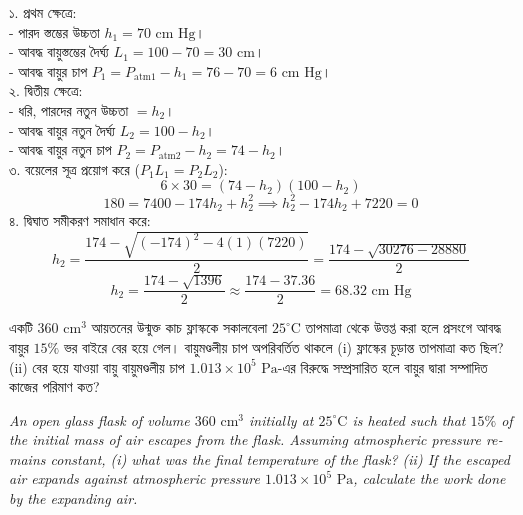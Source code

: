 \documentclass[12pt, a4paper]{article}
\begin{document}
{\vspace{1em}

\begin{tcolorbox}[solutionbox={সমাধান (Solution)}]
\noindent
১. প্রথম ক্ষেত্রে: \\
- পারদ স্তম্ভের উচ্চতা $h_1 = 70\text{ cm Hg}$। \\
- আবদ্ধ বায়ুস্তম্ভের দৈর্ঘ্য $L_1 = 100 - 70 = 30\text{ cm}$। \\
- আবদ্ধ বায়ুর চাপ $P_1 = P_{\text{atm1}} - h_1 = 76 - 70 = 6\text{ cm Hg}$। \\
২. দ্বিতীয় ক্ষেত্রে: \\
- ধরি, পারদের নতুন উচ্চতা $= h_2$। \\
- আবদ্ধ বায়ুর নতুন দৈর্ঘ্য $L_2 = 100 - h_2$। \\
- আবদ্ধ বায়ুর নতুন চাপ $P_2 = P_{\text{atm2}} - h_2 = 74 - h_2$। \\
৩. বয়েলের সূত্র প্রয়োগ করে ($P_1 L_1 = P_2 L_2$):
\[ 6 \times 30 = (74 - h_2)(100 - h_2) \]
\[ 180 = 7400 - 174 h_2 + h_2^2 \implies h_2^2 - 174 h_2 + 7220 = 0 \]
৪. দ্বিঘাত সমীকরণ সমাধান করে:
\[ h_2 = \frac{174 - \sqrt{(-174)^2 - 4(1)(7220)}}{2} = \frac{174 - \sqrt{30276 - 28880}}{2} \]
\[ h_2 = \frac{174 - \sqrt{1396}}{2} \approx \frac{174 - 37.36}{2} = 68.32\text{ cm Hg} \]
\end{tcolorbox}
\begin{tcolorbox}[questionbox={প্রশ্ন (Question) 8}]
\noindent
একটি $360\text{ cm}^3$ আয়তনের উন্মুক্ত কাচ ফ্লাস্ককে সকালবেলা $25^\circ\text{C}$ তাপমাত্রা থেকে উত্তপ্ত করা হলে প্রসংগে আবদ্ধ বায়ুর $15\%$ ভর বাইরে বের হয়ে গেল। বায়ুমণ্ডলীয় চাপ অপরিবর্তিত থাকলে (i) ফ্লাস্কের চূড়ান্ত তাপমাত্রা কত ছিল? (ii) বের হয়ে যাওয়া বায়ু বায়ুমণ্ডলীয় চাপ $1.013 \times 10^5\text{ Pa}$-এর বিরুদ্ধে সম্প্রসারিত হলে বায়ুর দ্বারা সম্পাদিত কাজের পরিমাণ কত?

\vspace{0.8em}
\begin{english}
\noindent\textit{\color{darkgray}
An open glass flask of volume $360\text{ cm}^3$ initially at $25^\circ\text{C}$ is heated such that $15\%$ of the initial mass of air escapes from the flask. Assuming atmospheric pressure remains constant, (i) what was the final temperature of the flask? (ii) If the escaped air expands against atmospheric pressure $1.013 \times 10^5\text{ Pa}$, calculate the work done by the expanding air.
}
\end{english}
\end{tcolorbox}

}
\end{document}
